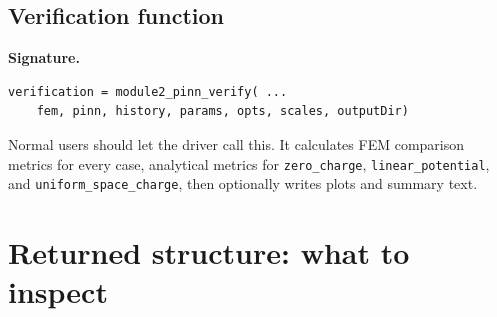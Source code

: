 \documentclass[11pt]{article}
\begin{document}
\subsection{Verification function}

\par\smallskip\noindent\textbf{Signature.}
\begin{lstlisting}[style=projectmatlab]
verification = module2_pinn_verify( ...
    fem, pinn, history, params, opts, scales, outputDir)
\end{lstlisting}
Normal users should let the driver call this. It calculates FEM comparison metrics for every case, analytical metrics for \texttt{zero\_charge}, \texttt{linear\_potential}, and \texttt{uniform\_space\_charge}, then optionally writes plots and summary text.

\section{Returned structure: what to inspect}
\end{document}
